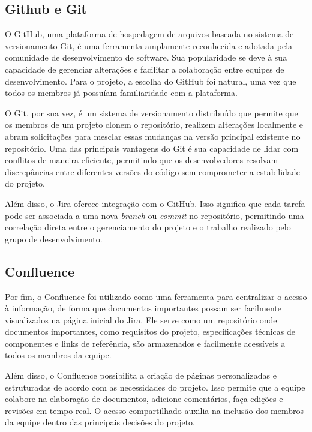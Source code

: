     \subsection{Github e Git}

    O GitHub, uma plataforma de hospedagem de arquivos baseada no sistema de versionamento Git, é uma ferramenta amplamente reconhecida e adotada pela comunidade de desenvolvimento de software. Sua popularidade se deve à sua capacidade de gerenciar alterações e facilitar a colaboração entre equipes de desenvolvimento. Para o projeto, a escolha do GitHub foi natural, uma vez que todos os membros já possuíam familiaridade com a plataforma.
    
    O Git, por sua vez, é um sistema de versionamento distribuído que permite que os membros de um projeto clonem o repositório, realizem alterações localmente e abram solicitações para mesclar essas mudanças na versão principal existente no repositório. Uma das principais vantagens do Git é sua capacidade de lidar com conflitos de maneira eficiente, permitindo que os desenvolvedores resolvam discrepâncias entre diferentes versões do código sem comprometer a estabilidade do projeto.
    
    Além disso, o Jira oferece integração com o GitHub. Isso significa que cada tarefa pode ser associada a uma nova \textit{branch} ou \textit{commit} no repositório, permitindo uma correlação direta entre o gerenciamento do projeto e o trabalho realizado pelo grupo de desenvolvimento.

    \subsection{Confluence}
    Por fim, o Confluence foi utilizado como uma ferramenta para centralizar o acesso à informação, de forma que documentos importantes possam ser facilmente visualizados na página inicial do Jira. Ele serve como um repositório onde documentos importantes, como requisitos do projeto, especificações técnicas de componentes e links de referência, são armazenados e facilmente acessíveis a todos os membros da equipe.
    
    Além disso, o Confluence possibilita a criação de páginas personalizadas e estruturadas de acordo com as necessidades do projeto. Isso permite que a equipe colabore na elaboração de documentos, adicione comentários, faça edições e revisões em tempo real. O acesso compartilhado auxilia na inclusão dos membros da equipe dentro das principais decisões do projeto.

